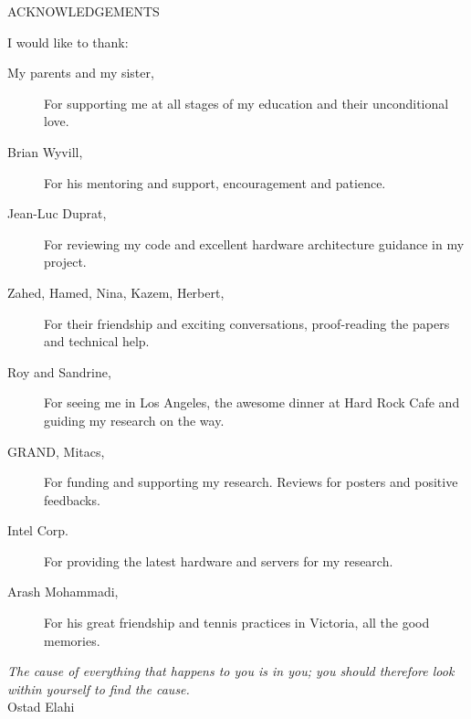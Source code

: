 \newpage
{}

\begin{center}
ACKNOWLEDGEMENTS
\end{center}

\noindent I would like to thank:
\begin{description}

\item[My parents and my sister,]
For supporting me at all stages of my education and their unconditional love.

\item[Brian Wyvill,]
For his mentoring and support, encouragement and patience.

\item[Jean-Luc Duprat,]
For reviewing my code and excellent hardware architecture guidance in my project. 

\item[Zahed, Hamed, Nina, Kazem, Herbert, ]
For their friendship and exciting conversations, proof-reading the papers and technical help.

\item[Roy and Sandrine,]
For seeing me in Los Angeles, the awesome dinner at Hard Rock Cafe and guiding my research on the way. 

\item[GRAND, Mitacs,]
For funding and supporting my research. Reviews for posters and positive feedbacks.

\item[Intel Corp.]
For providing the latest hardware and servers for my research.

\item[Arash Mohammadi,] 
For his great friendship and tennis practices in Victoria, all the good memories.



\end{description}

\begin{flushright}
\textit{The cause of everything that happens to you is in you; you should therefore 
look within yourself to find the cause.}\\
Ostad Elahi
\end{flushright}

